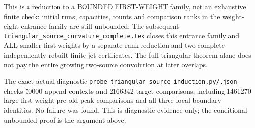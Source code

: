 This is a reduction to a BOUNDED FIRST-WEIGHT family, not an exhaustive
finite check: initial runs, capacities, counts and comparison ranks in
the weight-eight entrance family are still unbounded. The subsequent
\texttt{triangular\_source\_curvature\_complete.tex} closes this entrance
family and ALL smaller first weights by a separate rank reduction and
two complete independently rebuilt finite jet certificates.
The full triangular theorem alone does not pay the entire growing
two-source convolution at later overlaps.

The exact actual diagnostic
\texttt{probe\_triangular\_source\_induction.py/.json} checks 50000
append contexts and 2166342 target comparisons, including 1461270
large-first-weight pre-old-peak comparisons and all three local
boundary identities. No failure was found. This is diagnostic evidence
only; the conditional unbounded proof is the argument above.
